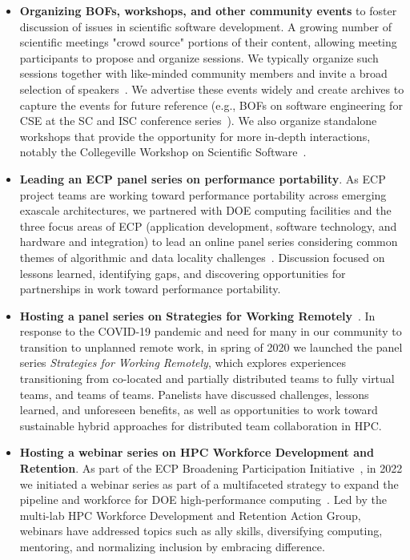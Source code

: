\begin{itemize}
\item {\bf Organizing BOFs, workshops, and other community events} to foster discussion of issues in scientific software development.  A growing number of scientific meetings "crowd source" portions of their content, allowing meeting participants to propose and organize sessions. We typically organize such
sessions together with like-minded community members and invite a
broad selection of speakers~\cite{www:ideas-events}. We advertise these events widely and create archives to capture the events for future reference (e.g., BOFs on software engineering for CSE at the SC and ISC conference series~\cite{SWE-CSE-bof-webpage}). We also organize standalone workshops that provide the opportunity for more in-depth interactions, notably the Collegeville Workshop on Scientific Software~\cite{Collegeville-workshop-series,CW2021-blog3}.

\item {\bf Leading an ECP panel series on performance portability}.  
As ECP project teams are working toward performance portability across emerging exascale architectures, we partnered with DOE computing facilities and the three focus areas of ECP (application development, software technology, and hardware and integration) to lead an online panel series considering common themes of algorithmic and data locality challenges~\cite{perfportpanel}.  Discussion focused on lessons learned, identifying gaps, and discovering opportunities for partnerships in work toward performance portability.

\item {\bf Hosting a panel series on Strategies for Working Remotely}~\cite{10.1007/978-3-031-05544-7_30,swr-webpage}. In response to the COVID-19 pandemic and need for many in our community to transition to unplanned remote work, in spring of 2020 we launched the panel series {\em Strategies for Working Remotely}, which explores experiences transitioning from co-located and partially distributed teams to fully virtual teams, and teams of teams. Panelists have discussed challenges, lessons learned, and unforeseen benefits, as well as opportunities to work toward sustainable hybrid approaches for distributed team collaboration in HPC. 

\item {\bf Hosting a webinar series on HPC Workforce Development and Retention}.  As part of the ECP Broadening Participation Initiative~\cite{ecp-broadening-participation-website2022,ECP-broader-engagement:2021-DOE-RFI}, in 2022 we initiated a webinar series as part of a multifaceted strategy to expand the pipeline and workforce for DOE high-performance computing~\cite{hpc-wdr-webinar-webpage}. Led by the multi-lab HPC Workforce Development and Retention Action Group, webinars have addressed topics such as ally skills, diversifying computing, mentoring, and normalizing inclusion by embracing difference. 

\end{itemize}

